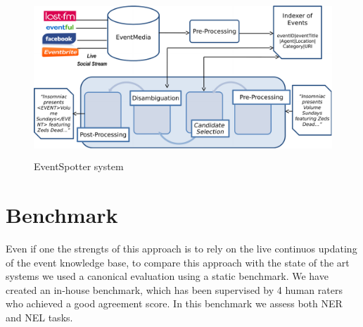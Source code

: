 \documentclass[10pt,a4paper]{article}
\begin{document}
%
%
%
%
%
%	
%
%	 

\begin{figure}
\includegraphics [width=13cm,height=6cm]{architecture}
\caption{EventSpotter system}
\label{fig:architecture}
\end{figure}


\section{Benchmark}
Even if one the strengts of this approach is to rely on the live continuos updating of the event knowledge base, to compare this approach with the state of the art systems we used a canonical evaluation using a static benchmark. We have created an in-house benchmark, which has been supervised by 4 human raters who achieved a good agreement score. In this benchmark we assess both NER and NEL tasks.
\end{document}
